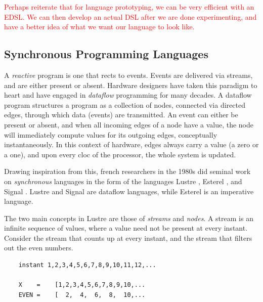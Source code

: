 \textcolor{red}{Perhaps reiterate that for language prototyping, we can be very efficient with an EDSL. We can then
develop an actual DSL after we are done experimenting, and have a better idea of what we want our language to look like.}


\subsection{Synchronous Programming Languages}

A \textit{reactive} program is one that rects to events. Events are delivered via streams, and are either present or absent.
Hardware designers have taken this paradigm to heart and have engaged in \textit{dataflow} programming for many decades.
A dataflow program structures a program as a collection of nodes, connected via directed edges, through which data (events) are
transmitted. An event can either be present or absent, and when all incoming edges of a node have a value, the node will
immediately compute values for its outgoing edges, conceptually instantaneously. In this context of hardware, edges always
carry a value (a zero or a one), and upon every cloc of the processor, the whole system is updated.

Drawing inspiration from this, french researchers in the 1980s did seminal work on \textit{synchronous} languages in the
form of the languages Lustre \cite{DBLP:conf/popl/CaspiPHP87}, Esterel \cite{DBLP:journals/scp/BerryG92},
and Signal \cite{DBLP:journals/scp/BenvenisteGJ91}. Lustre and Signal are dataflow languages, while Esterel
is an imperative language.

The two main concepts in Lustre are those of \textit{streams} and \textit{nodes}. A stream is an infinite sequence of values,
where a value need not be present at every instant. Consider the stream  that counts up at every instant, and
the stream  that filters out the even numbers.

\begin{verbatim}
    instant 1,2,3,4,5,6,7,8,9,10,11,12,...

    X    =    [1,2,3,4,5,6,7,8,9,10,...
    EVEN =    [  2,  4,  6,  8,  10,...
\end{verbatim}

